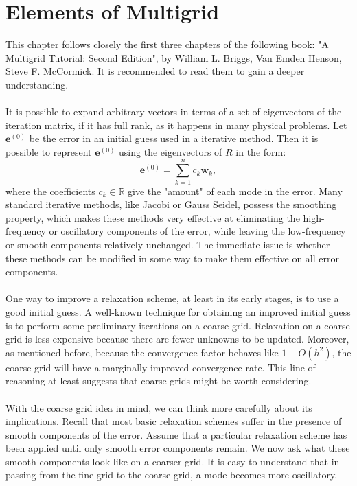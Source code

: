 \documentclass[11pt]{book}
\begin{document}
\chapter{Elements of Multigrid}
This chapter follows closely the first three chapters of the following book: "A Multigrid Tutorial: Second Edition", by  William L. Briggs, Van Emden Henson, Steve F. McCormick. It is recommended to read them to gain a deeper understanding.
\\ \\
It is possible to expand arbitrary vectors in terms of a set of eigenvectors of the iteration matrix, if it has full rank, as it happens in many physical problems.
Let $\textbf{e}^{(0)}$ be the error in an initial guess used in a iterative method. Then
it is possible to represent $\textbf{e}^{(0)}$
 using the eigenvectors of $R$ in the form:
 $$\textbf{e}^{(0)} = \sum_{k=1}^{n} c_k \textbf{w}_{k},$$
 where the coefficients $c_k \in \mathbb{R}$  give the "amount" of each mode in the error.
 Many standard iterative methods, like Jacobi or Gauss Seidel, possess the smoothing property, which makes these methods very effective at eliminating the high-frequency or oscillatory components of the error, while leaving the low-frequency or smooth components relatively unchanged. The immediate issue is whether these methods can be modified in some way to make them effective on all error components.\\ \\
One way to improve a relaxation scheme, at least in its early stages, is to use a good initial guess. A well-known technique for obtaining an improved initial guess is to perform some preliminary iterations on a coarse grid. Relaxation on a coarse grid is less expensive because there are fewer unknowns to be updated. Moreover, as mentioned before, because the convergence factor behaves like $1-O\left(h^{2}\right)$, the coarse grid will have a marginally improved convergence rate. This line of reasoning at least suggests that coarse grids might be worth considering.\\ \\
With the coarse grid idea in mind, we can think more carefully about its implications. Recall that most basic relaxation schemes suffer in the presence of smooth components of the error. Assume that a particular relaxation scheme has been applied until only smooth error components remain.  We now ask what these smooth
components look like on a coarser grid. It is easy to understand that 
in passing from the fine grid to the coarse grid, a mode becomes more oscillatory.\\ \\
\end{document}

